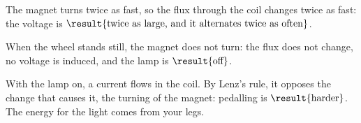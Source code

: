 \begin{abcliste}
\abc The magnet turns twice as fast, so the flux through the coil changes twice as fast: the voltage is $\result{\text{twice as large, and it alternates twice as often}}$.

\abc When the wheel stands still, the magnet does not turn: the flux does not change, no voltage is induced, and the lamp is $\result{\text{off}}$.

\abc With the lamp on, a current flows in the coil. By Lenz's rule, it opposes the change that causes it, the turning of the magnet: pedalling is $\result{\text{harder}}$. The energy for the light comes from your legs.
\end{abcliste}
